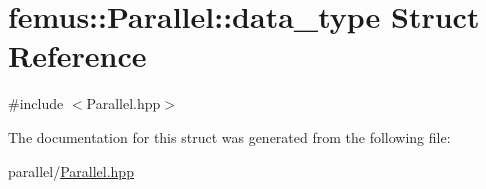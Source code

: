 \hypertarget{structfemus_1_1_parallel_1_1data__type}{}\section{femus\+:\+:Parallel\+:\+:data\+\_\+type Struct Reference}
\label{structfemus_1_1_parallel_1_1data__type}


{\ttfamily \#include $<$Parallel.\+hpp$>$}



The documentation for this struct was generated from the following file\+:\begin{DoxyCompactItemize}
\item 
parallel/\mbox{\hyperlink{_parallel_8hpp}{Parallel.\+hpp}}\end{DoxyCompactItemize}
